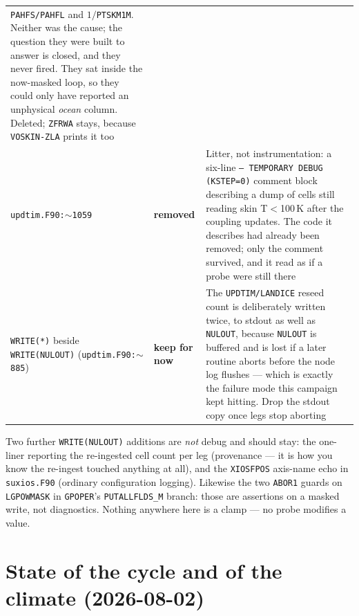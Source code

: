 \documentclass[11pt,a4paper]{article}
\newcommand{\code}[1]{\texttt{\small #1}}
\begin{document}
\begin{center}
\begin{tabular}{@{}p{4.1cm}p{2.0cm}p{9.4cm}@{}}
\code{PAHFS/PAHFL} and $1/$\code{PTSKM1M}. Neither was the cause; the question they were built to
answer is closed, and they never fired. They sat inside the now-masked loop, so they could only have
reported an unphysical \emph{ocean} column. Deleted; \code{ZFRWA} stays, because \code{VOSKIN-ZLA}
prints it too \\
\code{updtim.F90:$\sim$1059} & \textbf{removed} &
Litter, not instrumentation: a six-line \code{--- TEMPORARY DEBUG (KSTEP=0)} comment block
describing a dump of cells still reading skin T$<$100\,K after the coupling updates. The code it
describes had already been removed; only the comment survived, and it read as if a probe were
still there \\
\code{WRITE(*)} beside \code{WRITE(NULOUT)} \newline (\code{updtim.F90:$\sim$885}) &
\textbf{keep for now} &
The \code{UPDTIM/LANDICE} reseed count is deliberately written twice, to stdout as well as
\code{NULOUT}, because \code{NULOUT} is buffered and is lost if a later routine aborts before the
node log flushes --- which is exactly the failure mode this campaign kept hitting. Drop the stdout
copy once legs stop aborting \\
\bottomrule
\end{tabular}
\end{center}

\noindent Two further \code{WRITE(NULOUT)} additions are \emph{not} debug and should stay: the
one-liner reporting the re-ingested cell count per leg (provenance --- it is how you know the
re-ingest touched anything at all), and the \code{XIOSFPOS} axis-name echo in \code{suxios.F90}
(ordinary configuration logging). Likewise the two \code{ABOR1} guards on \code{LGPOWMASK} in
\code{GPOPER}'s \code{PUTALLFLDS\_M} branch: those are assertions on a masked write, not diagnostics.
Nothing anywhere here is a clamp --- no probe modifies a value.

\section{State of the cycle and of the climate (2026-08-02)}\label{sec:state}
\end{document}
